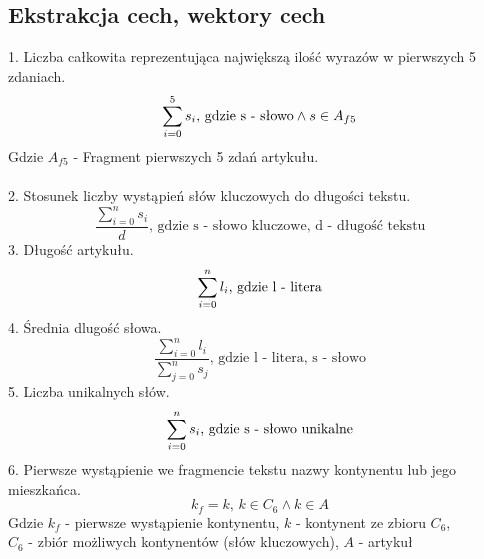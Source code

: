 \documentclass{classrep}
\begin{document}
\subsection{Ekstrakcja cech, wektory cech}
1. Liczba całkowita reprezentująca największą ilość wyrazów w pierwszych 5 zdaniach.\\
\begin{displaymath}
\sum_{i = 0}^{5} s_i \textrm{, gdzie s - słowo} \wedge s \in A_{f5}\\
\end{displaymath}
Gdzie $A_{f5}$ - Fragment pierwszych 5 zdań artykułu.\\
\\
2. Stosunek liczby wystąpień słów kluczowych do długości tekstu.\\
\begin{displaymath}
\frac{\sum_{i=0}^{n}s_i}{d}\textrm{, gdzie s - słowo kluczowe, d - długość tekstu}
\end{displaymath}
3. Długość artykułu.\\
\begin{displaymath}
\sum_{i = 0}^{n} l_i \textrm{, gdzie l - litera}\\
\end{displaymath}
4. Średnia dlugość słowa.\\
\begin{displaymath}
\frac{\sum_{i=0}^{n}l_i}{\sum_{j=0}^{n}s_j}\textrm{, gdzie l - litera, s - słowo}
\end{displaymath}
5. Liczba unikalnych słów.\\
\begin{displaymath}
\sum_{i = 0}^{n} s_i \textrm{, gdzie s - słowo unikalne}\\
\end{displaymath}
6. Pierwsze wystąpienie we fragmencie tekstu nazwy kontynentu lub jego mieszkańca.\\
\begin{displaymath}
k_f = k,\, k \in C_6 \wedge k \in A
\end{displaymath}
Gdzie $k_f$ - pierwsze wystąpienie kontynentu, $k$ - kontynent ze zbioru $C_6$, \\$C_6$ - zbiór możliwych kontynentów (słów kluczowych), $A$ - artykuł
\\
\end{document}
